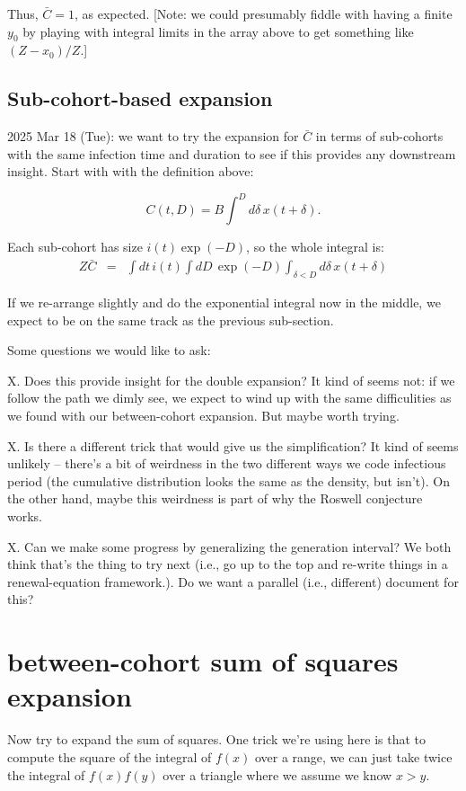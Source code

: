 \documentclass[12pt]{article}
\begin{document}
Thus, $\bar C = 1$, as expected. [Note: we could presumably fiddle with having a finite $y_0$ by playing with integral limits in the array above to get something like $(Z-x_0)/Z$.]

\subsection{Sub-cohort-based expansion}

2025 Mar 18 (Tue): we want to try the expansion for $\bar C$ in terms of sub-cohorts with the same infection time and duration to see if this provides any downstream insight. Start with with the definition above:

$$C(t, D) = B \int^D{d\delta\, x(t+\delta)}. $$

Each sub-cohort has size $i(t) \exp(-D)$, so the whole integral is:
\begin{eqnarray}
	Z \bar C
	&=& \int{dt\,
		i(t) \int{dD\, 
			\exp(-D) \int_{\delta<D}{d\delta\,
				x(t+\delta)
			}
		}
	}
\end{eqnarray}

If we re-arrange slightly and do the exponential integral now in the middle, we expect to be on the same track as the previous sub-section.

Some questions we would like to ask:

X. Does this provide insight for the double expansion? It kind of seems not: if we follow the path we dimly see, we expect to wind up with the same difficulities as we found with our between-cohort expansion. But maybe worth trying.

X. Is there a different trick that would give us the simplification? It kind of seems unlikely -- there's a bit of weirdness in the two different ways we code infectious period (the cumulative distribution looks the same as the density, but isn't). On the other hand, maybe this weirdness is part of why the Roswell conjecture works.

X. Can we make some progress by generalizing the generation interval? We both think that's the thing to try next (i.e., go up to the top and re-write things in a renewal-equation framework.). Do we want a parallel (i.e., different) document for this?

\section{between-cohort sum of squares expansion}
Now try to expand the sum of squares. One trick we're using here is that to compute the square of the integral of $f(x)$ over a range, we can just take twice the integral of $f(x)f(y)$ over a triangle where we assume we know $x>y$.
\end{document}
